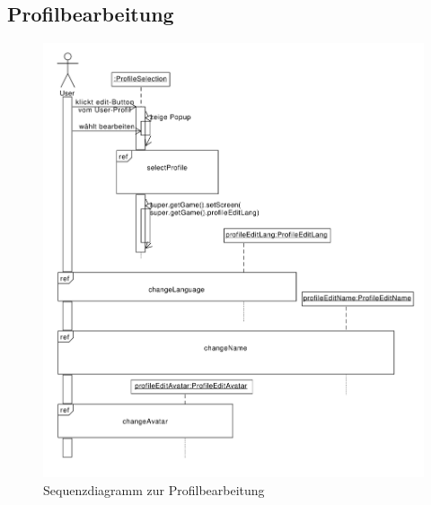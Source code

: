 \subsection{Profilbearbeitung}
\begin{figure}[H]
\centering
\includegraphics[scale=0.6]{../sequence_diagrams/profile_scenarios/ProfileEdit.pdf}
\caption{Sequenzdiagramm zur Profilbearbeitung}
\end{figure}
